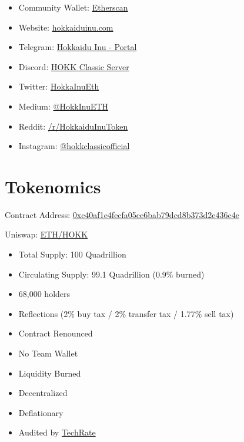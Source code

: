 \documentclass{article}
\begin{document}
\bigskip
\begin{tcolorbox}[enhanced,attach boxed title to top center={yshift=-3mm,yshifttext=-1mm},
  colback=salmon1!10!white,colframe=pink1,colbacktitle=pink1,
  title=Community Links,fonttitle=\bfseries,
  boxed title style={size=small,colframe=pink1} ]
  \begin{itemize}
  \item Community Wallet: \href{https://etherscan.io/address/0x7e1F96f302fd029585B6C9d05A80A54Bc5533A84}{Etherscan}
  \item Website: \href{https://hokkaiduinu.com/}{hokkaiduinu.com}
  \item Telegram: \href{https://t.me/HokkaiduInuOfficial}{Hokkaidu Inu - Portal}
  \item Discord: \href{https://discord.gg/tY2JsTXP}{HOKK Classic Server}
  \item Twitter: \href{https://twitter.com/HokkaInuEth}{HokkaInuEth}
  \item Medium: \href{https://medium.com/@HokkInuETH}{@HokkInuETH}
  \item Reddit: \href{https://reddit.com/r/HokkaiduInuToken}{/r/HokkaiduInuToken}
  \item Instagram: \href{https://www.instagram.com/hokkclassicofficial/}{@hokkclassicofficial}
  \end{itemize}
\end{tcolorbox}

\newpage
\section{Tokenomics}
Contract Address: \href{https://etherscan.io/token/0xc40af1e4fecfa05ce6bab79dcd8b373d2e436c4e}{0xc40af1e4fecfa05ce6bab79dcd8b373d2e436c4e}

\smallskip
{\raggedleft Uniswap: \href{https://v2.info.uniswap.org/pair/0x9314941c11d6dee1d7bf93113eb74d4718949f3b}{ETH/HOKK}}

\bigskip
\begin{tcolorbox}[enhanced,attach boxed title to top center={yshift=-3mm,yshifttext=-1mm},
  colback=salmon1!10!white,colframe=pink1,colbacktitle=pink1,
  title=Fast Facts,fonttitle=\bfseries,
  boxed title style={size=small,colframe=pink1} ]
  \begin{itemize}
  \item Total Supply: 100 Quadrillion
  \item Circulating Supply: 99.1 Quadrillion (0.9\% burned)
  \item 68,000 holders
  \item Reflections (2\% buy tax / 2\% transfer tax / 1.77\% sell tax)
  \item Contract Renounced
  \item No Team Wallet
  \item Liquidity Burned
  \item Decentralized
  \item Deflationary
  \item Audited by \href{https://github.com/TechRate/Smart-Contract-Audits/blob/main/2018-21%20A-M/Hokkaidu%20Inu.pdf}{TechRate}
\end{itemize}
\end{tcolorbox}
\end{document}
